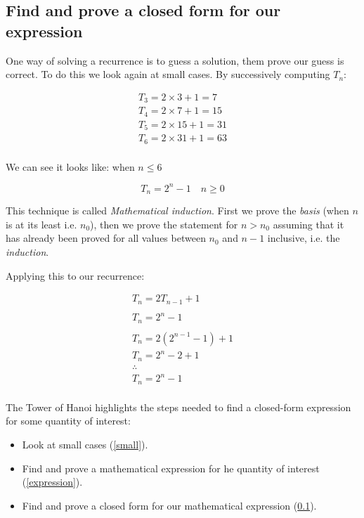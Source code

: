 \documentclass[12pt letter]{report}
\begin{document}
\subsection{Find and prove a closed form for our expression}\label{closed}

One way of solving a recurrence is to guess a solution, them prove our guess is correct. To do this we look again at
small cases. By successively computing $T_n$:

\begin{align*}
  T_3 = 2  \times  3 + 1 = 7   \\
  T_4 = 2  \times  7 + 1 = 15  \\
  T_5 = 2  \times  15 + 1 = 31 \\
  T_6 = 2  \times  31 + 1 = 63 \\
\end{align*}

We can see it looks like: when $n \leq 6$

\[
  T_n = 2^{n} - 1 \quad n \geq 0
\]

This technique is called \textit{Mathematical induction}. First we prove the \textit{basis}\label{basis} (when $n$ is at its least
i.e. $n_0$), then we prove the statement for $n > n_0$ assuming that it has already been proved for all values between
$n_0$ and $n - 1$ inclusive, i.e. the \textit{induction}\label{induction}.

Applying this to our recurrence:

\begin{align*}
  T_n = 2T_{n-1} + 1       \\
  \\
  T_n = 2^{n} - 1          \\
  \\
  T_n = 2(2^{n-1} -1 ) + 1 \\
  T_n = 2^{n} -2 + 1       \\
  \therefore               \\
  T_n = 2^n -1             \\
\end{align*}

The Tower of Hanoi highlights the steps needed to find a closed-form expression for some quantity of interest:

\begin{itemize}
  \item Look at small cases (\ref{small}).
  \item Find and prove a mathematical expression for he quantity of interest (\ref{expression}).
  \item Find and prove a closed form for our mathematical expression (\ref{closed}).
\end{itemize}
\end{document}
